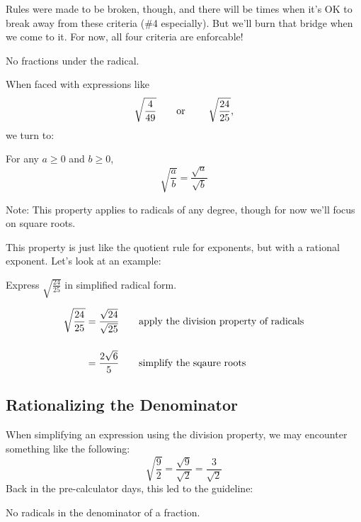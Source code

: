 Rules were made to be broken, though, and there will be times when it's OK to break away from these criteria (\#4 especially). But we'll burn that bridge when we come to it. For now, all four criteria are enforcable!

\begin{boxedcriteria}
No fractions under the radical.
\end{boxedcriteria}

When faced with expressions like \[\sqrt{\frac{4}{49}} \text{\qquad or \qquad} \sqrt{\frac{24}{25}},\]we turn to:

\begin{boxeddef}
\begin{center}
For any $a \geq 0$ and $b \geq 0$, \[\sqrt{\frac{a}{b}} = \dfrac{\sqrt{a}}{\sqrt{b}}\]
\end{center}

\bigskip\noindent
Note: This property applies to radicals of any degree, though for now we'll focus on square roots.
\end{boxeddef}

This property is just like the quotient rule for exponents, but with a rational exponent. Let's look at an example:

\begin{boxedex}
Express $\sqrt{\frac{24}{25}}$ in simplified radical form.

\bigskip{}
\[\begin{aligned}
\sqrt{\frac{24}{25}}	&= \frac{\sqrt{24}}{\sqrt{25}}
&& \text{\quad apply the division property of radicals}\\[3ex]
					&= \frac{2\sqrt{6}}{5}
&& \text{\quad simplify the sqaure roots}\\
\end{aligned}
\]
\end{boxedex}

\subsection{Rationalizing the Denominator}

When simplifying an expression using the division property, we may encounter something like the following: \[\sqrt{\frac{9}{2}} = \frac{\sqrt{9}}{\sqrt{2}} = \frac{3}{\sqrt{2}}\]
Back in the pre-calculator days, this led to the guideline:

\begin{boxedcriteria}
No radicals in the denominator of a fraction.
\end{boxedcriteria}

